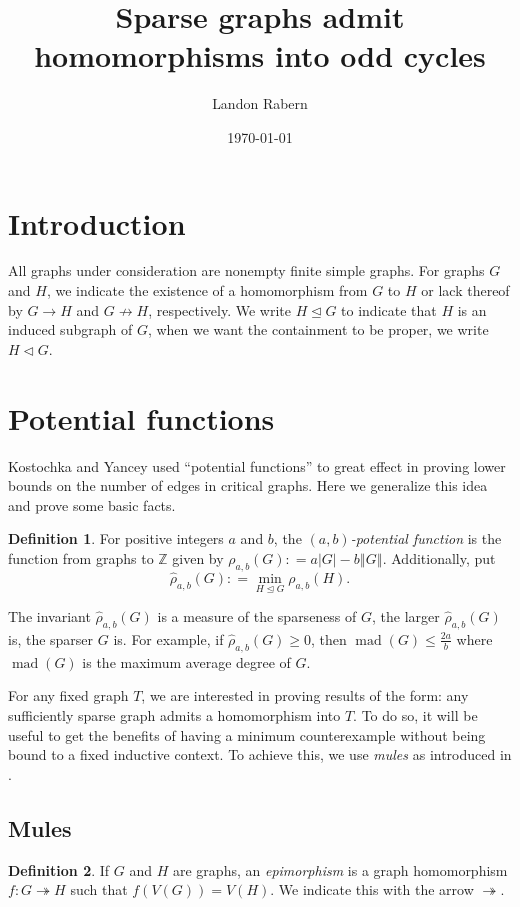 \documentclass[12pt]{amsart}
\title{Sparse graphs admit homomorphisms into odd cycles}
\author{Landon Rabern}
\date{\today}
\theoremstyle{plain}
\theoremstyle{definition}
\newtheorem{defn}{Definition}
\theoremstyle{remark}
\newcommand{\IZ}{\mathbb{Z}}
\newcommand{\surj}{\twoheadrightarrow}
\newcommand{\card}[1]{\left|#1\right|}
\newcommand{\size}[1]{\left\Vert#1\right\Vert}
\newcommand{\funcsurj}[3]{#1\colon #2 \surj #3}
\newcommand{\DefinedAs}{\mathrel{\mathop:}=}
\newcommand{\mad}{\operatorname{mad}}
\begin{document}
\begin{abstract}
\end{abstract}
\maketitle

\section{Introduction}
All graphs under consideration are nonempty finite simple graphs. For graphs $G$ and $H$, we indicate the existence of a homomorphism from $G$ to $H$ or lack thereof by $G \rightarrow H$ and $G \not \rightarrow H$, respectively.  We write $H \unlhd G$ to indicate that $H$ is an induced subgraph of $G$, when we want the containment to be proper, we write $H \lhd G$. 

\section{Potential functions}
Kostochka and Yancey \cite{kostochkayancey2012ore} used ``potential functions'' to great effect in proving lower bounds on the number of edges in critical graphs. Here we generalize this idea and prove some basic facts.

\begin{defn}
For positive integers $a$ and $b$, the \emph{$(a,b)$-potential function} is the function from graphs to $\IZ$ given by $\rho_{a,b}(G) \DefinedAs a\card{G} - b\size{G}$.  Additionally, put
\[\hat{\rho}_{a,b}(G) \DefinedAs \min_{H \unlhd G} \rho_{a,b}(H).\]
\end{defn}

The invariant $\hat{\rho}_{a,b}(G)$ is a measure of the sparseness of $G$, the larger $\hat{\rho}_{a,b}(G)$ is, the sparser $G$ is.  For example, if $\hat{\rho}_{a,b}(G) \ge 0$, then $\mad(G) \le \frac{2a}{b}$ where $\mad(G)$ is the maximum average degree of $G$.

For any fixed graph $T$, we are interested in proving results of the form: any sufficiently sparse graph admits a homomorphism into $T$.  To do so, it will be useful to get the benefits of having a minimum counterexample without being bound to a fixed inductive context.  To achieve this, we use \emph{mules} as introduced in \cite{CranstonR-equiv, raberndiss}. 

\subsection{Mules}
\begin{defn}
\label{epi}
If $G$ and $H$ are graphs, an \emph{epimorphism} is a graph homomorphism $\funcsurj{f}{G}{H}$ such that $f(V(G)) = V(H)$.  We indicate this with the arrow $\surj$.
\end{defn}
\end{document}
